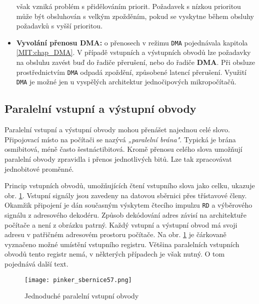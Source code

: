 \begin{itemize}
               však vzniká problém s přidělováním priorit. Požadavek s nízkou prioritou 
               může být obsluhován s velkým zpožděním, pokud se vyskytne během obsluhy požadavků s 
               vyšší prioritou.
        \item  \textbf{Vyvolání přenosu DMA:} o přenosech v režimu \texttt{DMA} pojednávala  
               kapitola \ref{MIT:chap_DMA}. V případě vstupních a výstupních obvodů lze požadavky 
               na obsluhu zavést buď do řadiče přerušení, nebo do řadiče \textbf{DMA}. Při obsluze 
               prostřednictvím  \texttt{DMA} odpadá zpoždění, způsobené latencí přerušení. Využití 
               \texttt{DMA} je možné jen u vyspělých architektur jednočipových mikropočítačů.
      \end{itemize}
      
    \subsection{Paralelní vstupní a výstupní obvody}
      Paralelní vstupní a výstupní obvody mohou přenášet najednou celé slovo. Připojovací místo na 
      počítači se nazývá \emph{„paralelní brána"}. Typická je brána osmibitová, méně často 
      šestnáctibitová. Kromě přenosu celého slova umožňují paralelní obvody zpravidla i přenos 
      jednotlivých bitů. Lze tak zpracovávat jednobitové proměnné.
      
      Princip vstupních obvodů, umožňujících čtení vstupního slova jako celku, ukazuje obr. 
      \ref{MIT:fig_sbernice57}. Vstupní signály jsou zavedeny na datovou sběrnici přes třístavové 
      členy. Okamžik připojení je dán současným výskytem čtecího impulzu \texttt{RD} a výběrového 
      signálu z adresového dekodéru. Způsob dekódování adres závisí na architektuře počítače a není 
      z obrázku patrný. Každý vstupní a výstupní obvod má svoji adresu v patřičném adresovém 
      prostoru počítače. Na obr. \ref{MIT:fig_sbernice57} je čárkovaně vyznačeno možné umístění 
      vstupního registru. Většina paralelních vstupních obvodů tento registr nemá, v některých 
      případech je však nutný. O tom pojednává další text.
    
      \begin{figure}[ht!] %
        \centering
        \texttt{[image: pinker\_sbernice57.png]}
        \caption{Jednoduché paralelní vstupní obvody}
        \label{MIT:fig_sbernice57}
      \end{figure}
      
